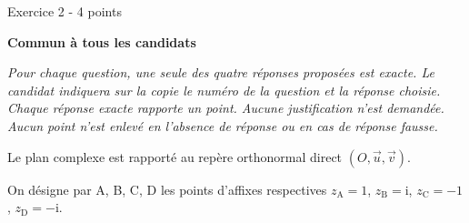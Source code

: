 
%
\begin{h2}Exercice 2 - 4 points\end{h2}
\textbf{Commun à tous les candidats}
\par
\textit{Pour chaque question, une seule des quatre réponses proposées est exacte. Le candidat indiquera sur la copie le numéro de la question et la réponse choisie. Chaque réponse exacte rapporte un point. 
Aucune justification n'est demandée. Aucun point n'est enlevé en l'absence de réponse ou en cas de réponse fausse.}
\par
Le plan complexe est rapporté au repère orthonormal direct $\left(O,\vec{u},\vec{v}\right)$.
\par
On désigne par A, B, C, D les points d'affixes respectives $z_{\text{A}}=1$, $z_{\text{B}}=\text{i}$, $z_{\text{C}}=- 1$, $z_{\text{D}}=- \text{i}$.
